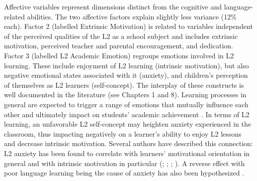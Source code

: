 \documentclass[output=paper]{langsci/langscibook}
\begin{document}
Affective variables represent dimensions distinct from the cognitive and lan\-guage-re\-lat\-ed abilities. The two affective factors explain slightly less variance (12\% each). Factor 2 (labelled Extrinsic Motivation) is related to variables independent of the perceived qualities of the L2 as a school subject and includes extrinsic motivation, perceived teacher and parental encouragement, and dedication. Factor 3 (labelled L2 Academic Emotion) regroups emotions involved in L2 learning. These include enjoyment of L2 learning (intrinsic motivation), but also negative emotional states associated with it (anxiety), and children’s perception of themselves as L2 learners (self-concept). The interplay of these constructs is well documented in the literature (see Chapters 1 and 8). Learning processes in general are expected to trigger a range of emotions that mutually influence each other and ultimately impact on students’ academic achievement \citep{PekrunEtAl2002}. In terms of L2 learning, an unfavorable L2 self-concept may heighten anxiety experienced in the classroom, thus impacting negatively on a learner’s ability to enjoy L2 lessons and decrease intrinsic motivation. Several authors have described this connection: L2 anxiety has been found to correlate with learners’ motivational orientation in general \citep[189]{Heinzmann2013} and with intrinsic motivation in particular (\citealt{NoelsEtAl2000}; \citealt{Stoeckli2004}; \citealt{KormosCsizer2008}; \citealt{LiuHuang2011}). A reverse effect with poor language learning being the cause of anxiety has also been hypothesized \citep{SparksEtAl2011}. 
\end{document}
